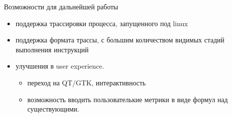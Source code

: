 \documentclass[10pt,aspectratio=169,hyperref={pdftex,unicode},xcolor=dvipsnames]{beamer}
\begin{document}
\begin{frame}{ Возможности для дальнейшей работы }
    \begin{itemize}
        \item поддержка трассировки процесса, запущенного под linux
        \item поддержка формата трассы, с большим количеством видимых стадий
              выполнения инструкций
        \item улучшения в user experience.
            \begin{itemize}
                \item переход на QT/GTK, интерактивность
                \item возможность вводить пользователькие метрики в виде формул над существующими.
            \end{itemize}
    \end{itemize}
\end{frame}

%
%
%
%
\end{document}
